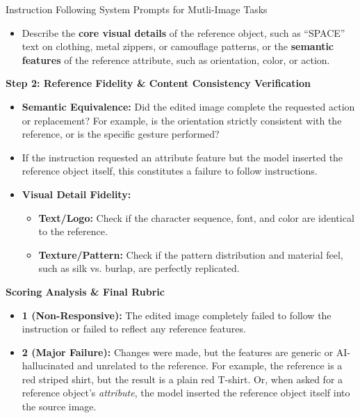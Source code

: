 \documentclass{llmxive}
\begin{document}
\begin{promptbox}[label={System Prompts: IF_Multi-Image}]{Instruction Following System Prompts for Mutli-Image Tasks}
\begin{itemize}[leftmargin=2.2em, labelsep=0.4em, itemsep=2pt]
    \item Describe the \textbf{core visual details} of the reference object, such as ``SPACE'' text on clothing, metal zippers, or camouflage patterns, or the \textbf{semantic features} of the reference attribute, such as orientation, color, or action.
\end{itemize}

\medskip

\textbf{Step 2: Reference Fidelity \& Content Consistency Verification}

\begin{itemize}[leftmargin=2.2em, labelsep=0.4em, itemsep=2pt]
    \item \textbf{Semantic Equivalence:} Did the edited image complete the requested action or replacement? For example, is the orientation strictly consistent with the reference, or is the specific gesture performed?
    
    \item If the instruction requested an attribute feature but the model inserted the reference object itself, this constitutes a failure to follow instructions.
    
    \item \textbf{Visual Detail Fidelity:}
    
    \begin{itemize}
        \item \textbf{Text/Logo:} Check if the character sequence, font, and color are identical to the reference.
        
        \item \textbf{Texture/Pattern:} Check if the pattern distribution and material feel, such as silk vs. burlap, are perfectly replicated.
    \end{itemize}
\end{itemize}

\medskip

\textbf{Scoring Analysis \& Final Rubric}

\begin{itemize}[leftmargin=2.2em, labelsep=0.4em, itemsep=2pt]
    \item \textbf{1 (Non-Responsive):} The edited image completely failed to follow the instruction or failed to reflect any reference features.
    
    \item \textbf{2 (Major Failure):} Changes were made, but the features are generic or AI-hallucinated and unrelated to the reference. For example, the reference is a red striped shirt, but the result is a plain red T-shirt. Or, when asked for a reference object's \textit{attribute}, the model inserted the reference object itself into the source image.
    

\end{itemize}
\end{promptbox}
\end{document}
